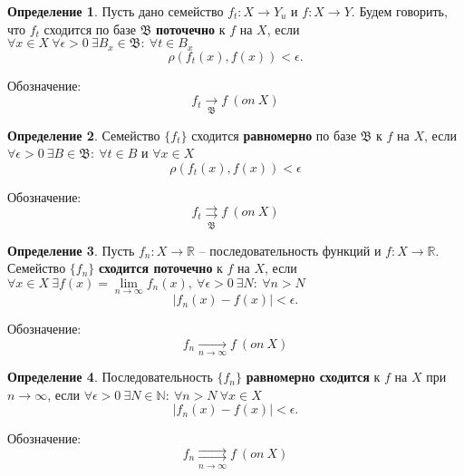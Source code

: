 \documentclass{report}
\theoremstyle{definition}
\newtheorem{definition}{Определение}[section]
\begin{document}
\begin{definition}
  Пусть дано семейство $f_t: X \rightarrow Y_u$ и $f: X \rightarrow Y$. Будем говорить, что $f_t$ сходится по базе $\mathfrak{B}$ \textbf{поточечно} к $f$ на $X$, если $\forall x \in X \ \forall \epsilon > 0 \ \exists B_x \in \mathfrak{B}: \ \forall t \in B_x$
  \begin{equation*}
    \rho(f_t(x),f(x)) < \epsilon.
  \end{equation*}

  Обозначение:
  \begin{equation*}
    f_t \underset{\mathfrak{B}}{\rightarrow} f \ (on \ X)
  \end{equation*}
\end{definition}

\begin{definition}
  Семейство $\{f_t\}$ сходится \textbf{равномерно} по базе $\mathfrak{B}$ к $f$ на $X$, если $\forall \epsilon > 0 \ \exists B \in \mathfrak{B}: \ \forall t \in B$ и $\forall x \in X$
  \begin{equation*}
    \rho(f_t(x),f(x)) < \epsilon
  \end{equation*}

  Обозначение:
  \begin{equation*}
    f_t \underset{\mathfrak{B}}{\rightrightarrows} f \ (on \ X)
  \end{equation*}
\end{definition}

\begin{definition}
  Пусть $f_n: X \rightarrow \mathbb{R}$ -- последовательность функций и $f: X \rightarrow \mathbb{R}$. Семейство $\{f_n\}$ \textbf{сходится поточечно} к $f$ на $X$, если $\forall x \in X \ \exists f(x) = \underset{n\rightarrow\infty}{\lim}f_n(x), \ \forall \epsilon > 0 \ \exists N: \ \forall n > N$
  \begin{equation*}
    |f_n(x) - f(x)| < \epsilon.
  \end{equation*}

  Обозначение:
  \begin{equation*}
    f_n \underset{n\rightarrow\infty}{\rightarrow}f \ (on \ X)
  \end{equation*}
\end{definition}

\begin{definition}
  Последовательность $\{f_n\}$ \textbf{равномерно сходится} к $f$ на $X$ при $n\rightarrow\infty$, если $\forall \epsilon > 0 \ \exists N \in \mathbb{N}: \ \forall n > N \ \forall x \in X$
  \begin{equation*}
    |f_n(x) - f(x)| < \epsilon.
  \end{equation*}

  Обозначение:
  \begin{equation*}
    f_n \underset{n\rightarrow\infty}{\rightrightarrows} f \ (on \ X)
  \end{equation*}
\end{definition}
\end{document}
